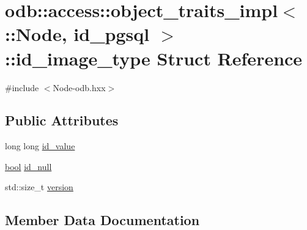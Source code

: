 \hypertarget{structodb_1_1access_1_1object__traits__impl_3_01_1_1_node_00_01id__pgsql_01_4_1_1id__image__type}{}\section{odb\+:\+:access\+:\+:object\+\_\+traits\+\_\+impl$<$ \+:\+:Node, id\+\_\+pgsql $>$\+:\+:id\+\_\+image\+\_\+type Struct Reference}
\label{structodb_1_1access_1_1object__traits__impl_3_01_1_1_node_00_01id__pgsql_01_4_1_1id__image__type}


{\ttfamily \#include $<$Node-\/odb.\+hxx$>$}

\subsection*{Public Attributes}
\begin{DoxyCompactItemize}
\item 
long long \hyperlink{structodb_1_1access_1_1object__traits__impl_3_01_1_1_node_00_01id__pgsql_01_4_1_1id__image__type_a30ace8e2291763d5253f693c2c41833b}{id\+\_\+value}
\item 
\hyperlink{classodb_1_1access_1_1object__traits_3_01_1_1_node_01_4_a432d6a340380ba002f9f3a4ef369ad3b}{bool} \hyperlink{structodb_1_1access_1_1object__traits__impl_3_01_1_1_node_00_01id__pgsql_01_4_1_1id__image__type_a9ca859ea30d86f8459dd87b1cf73a2c5}{id\+\_\+null}
\item 
std\+::size\+\_\+t \hyperlink{structodb_1_1access_1_1object__traits__impl_3_01_1_1_node_00_01id__pgsql_01_4_1_1id__image__type_a46b25efede2167b0d2917d57c8228c01}{version}
\end{DoxyCompactItemize}


\subsection{Member Data Documentation}
\hypertarget{structodb_1_1access_1_1object__traits__impl_3_01_1_1_node_00_01id__pgsql_01_4_1_1id__image__type_a9ca859ea30d86f8459dd87b1cf73a2c5}{}
